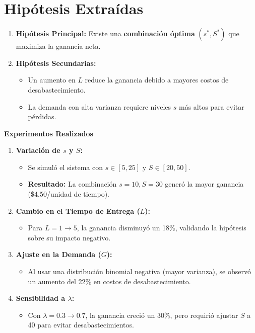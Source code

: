\documentclass[a4paper,12pt]{article}
\begin{document}
\section*{Hipótesis Extraídas}
\begin{enumerate}
    \item \textbf{Hipótesis Principal:}  
    Existe una \textbf{combinación óptima} \((s^*, S^*)\) que maximiza la ganancia neta.  

    \item \textbf{Hipótesis Secundarias:}  
    \begin{itemize}
        \item Un aumento en \( L \) reduce la ganancia debido a mayores costos de desabastecimiento.  
        \item La demanda con alta varianza requiere niveles \( s \) más altos para evitar pérdidas.  
    \end{itemize}
\end{enumerate}


\textbf{Experimentos Realizados}  
\begin{enumerate}
    \item \textbf{Variación de \( s \) y \( S \):}  
    \begin{itemize}
        \item Se simuló el sistema con \( s \in [5, 25] \) y \( S \in [20, 50] \).  
        \item \textbf{Resultado:} La combinación \( s = 10, S = 30 \) generó la mayor ganancia (\$4.50/unidad de tiempo).  
    \end{itemize}

    \item \textbf{Cambio en el Tiempo de Entrega (\( L \)):}  
    \begin{itemize}
        \item Para \( L = 1 \rightarrow 5 \), la ganancia disminuyó un 18\%, validando la hipótesis sobre su impacto negativo.  
    \end{itemize}

    \item \textbf{Ajuste en la Demanda (\( G \)):}  
    \begin{itemize}
        \item Al usar una distribución binomial negativa (mayor varianza), se observó un aumento del 22\% en costos de desabastecimiento.  
    \end{itemize}

    \item \textbf{Sensibilidad a \( \lambda \):}  
    \begin{itemize}
        \item Con \( \lambda = 0.3 \rightarrow 0.7 \), la ganancia creció un 30\%, pero requirió ajustar \( S \) a 40 para evitar desabastecimientos.  
    \end{itemize}
\end{enumerate}
\end{document}

